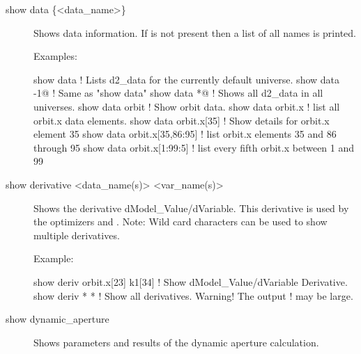 {{{\begin{description}

\item[show data \{<data\_name>\}] \Newline

\vskip -0.2in

Shows data information. If  is not
present then a list of all  names is printed.

Examples:
\begin{example}
  show data                   ! Lists d2_data for the currently default universe.
  show data -1@               ! Same as "show data"
  show data *@                ! Shows all d2_data in all universes.
  show data orbit             ! Show orbit data.
  show data orbit.x           ! list all orbit.x data elements.
  show data orbit.x[35]       ! Show details for orbit.x element 35
  show data orbit.x[35,86:95] ! list orbit.x elements 35 and 86 through 95
  show data orbit.x[1:99:5]   ! list every fifth orbit.x between 1 and 99  
\end{example}


\item[show derivative <data\_name(s)> <var\_name(s)>] \Newline

\vskip -0.2in

Shows the derivative dModel\_Value/dVariable. This derivative is used
by the optimizers  and . Note: Wild card characters can
be used to show multiple derivatives.

Example:
\begin{example}
  show deriv orbit.x[23] k1[34] ! Show dModel_Value/dVariable Derivative.
  show deriv * *                ! Show all derivatives. Warning! The output 
                                ! may be large.
\end{example}


\item[show dynamic_aperture] \Newline

\vskip -0.2in

Shows parameters and results of the dynamic aperture calculation.



\end{description}}}}
